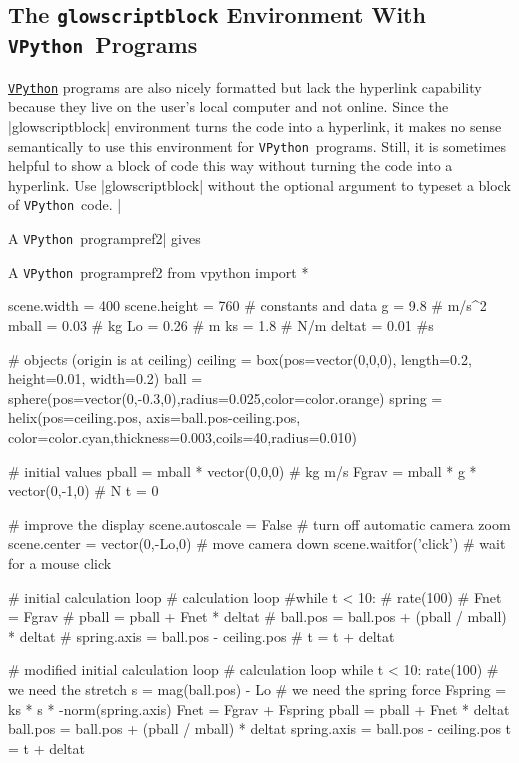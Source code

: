 \documentclass{article}
\newcommand*{\VPython}{\texttt{VPython}}              %
\begin{document}
\subsection{The \texttt{glowscriptblock} Environment With \VPython\ Programs}
\href{https://vpython.org}{\VPython} programs are also nicely formatted but lack the hyperlink capability
because they live on the user's local computer and not online. Since the |glowscriptblock| environment 
turns the code into a hyperlink, it makes no sense semantically to use this environment for \VPython\ 
programs. Still, it is sometimes helpful to show a block of code this way without turning the code into 
a hyperlink. Use |glowscriptblock| without the optional argument to typeset a block of \VPython\ code. 
|\begin{glowscriptblock}{A \VPython\ program}{pref2}| gives

\begin{glowscriptblock}{A \VPython\ program}{pref2}
from vpython import *

scene.width = 400
scene.height = 760
# constants and data
g = 9.8       # m/s^2
mball = 0.03  # kg
Lo = 0.26     # m
ks = 1.8      # N/m
deltat = 0.01 #s 

# objects (origin is at ceiling)
ceiling = box(pos=vector(0,0,0), length=0.2, height=0.01, width=0.2)
ball = sphere(pos=vector(0,-0.3,0),radius=0.025,color=color.orange)
spring = helix(pos=ceiling.pos, axis=ball.pos-ceiling.pos,
         color=color.cyan,thickness=0.003,coils=40,radius=0.010)

# initial values
pball = mball * vector(0,0,0)      # kg m/s
Fgrav = mball * g * vector(0,-1,0) # N
t = 0

# improve the display
scene.autoscale = False        # turn off automatic camera zoom
scene.center = vector(0,-Lo,0) # move camera down
scene.waitfor('click')         # wait for a mouse click

# initial calculation loop
# calculation loop
#while t < 10:
#    rate(100)
#    Fnet = Fgrav
#    pball = pball + Fnet * deltat
#    ball.pos = ball.pos + (pball / mball) * deltat
#    spring.axis = ball.pos - ceiling.pos
#    t = t + deltat
    
# modified initial calculation loop
# calculation loop
while t < 10:
    rate(100)
    # we need the stretch
    s = mag(ball.pos) - Lo
    # we need the spring force
    Fspring = ks * s * -norm(spring.axis)
    Fnet = Fgrav + Fspring
    pball = pball + Fnet * deltat
    ball.pos = ball.pos + (pball / mball) * deltat
    spring.axis = ball.pos - ceiling.pos
    t = t + deltat
\end{glowscriptblock}


\end{glowscriptblock}
\end{document}
